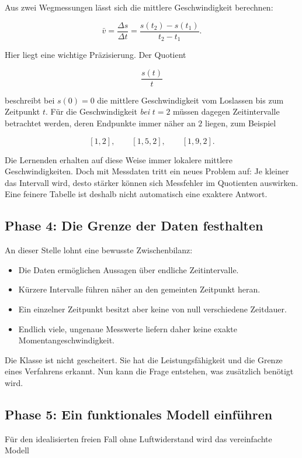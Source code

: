 \documentclass[11pt,a4paper]{article}
\begin{document}
Aus zwei Wegmessungen lässt sich die mittlere Geschwindigkeit berechnen:

\[
  \bar v=\frac{\Delta s}{\Delta t}
  =\frac{s(t_2)-s(t_1)}{t_2-t_1}.
\]

Hier liegt eine wichtige Präzisierung. Der Quotient

\[
  \frac{s(t)}{t}
\]

beschreibt bei $s(0)=0$ die mittlere Geschwindigkeit vom Loslassen bis zum
Zeitpunkt $t$. Für die Geschwindigkeit \emph{bei} $t=2$ müssen dagegen
Zeitintervalle betrachtet werden, deren Endpunkte immer näher an $2$ liegen,
zum Beispiel

\[
  [1,2],\qquad [1{,}5,2],\qquad [1{,}9,2].
\]

Die Lernenden erhalten auf diese Weise immer lokalere mittlere
Geschwindigkeiten. Doch mit Messdaten tritt ein neues Problem auf: Je kleiner
das Intervall wird, desto stärker können sich Messfehler im Quotienten
auswirken. Eine feinere Tabelle ist deshalb nicht automatisch eine exaktere
Antwort.

\subsection{Phase 4: Die Grenze der Daten festhalten}

An dieser Stelle lohnt eine bewusste Zwischenbilanz:

\begin{itemize}
  \item Die Daten ermöglichen Aussagen über endliche Zeitintervalle.
  \item Kürzere Intervalle führen näher an den gemeinten Zeitpunkt heran.
  \item Ein einzelner Zeitpunkt besitzt aber keine von null verschiedene
        Zeitdauer.
  \item Endlich viele, ungenaue Messwerte liefern daher keine exakte
        Momentangeschwindigkeit.
\end{itemize}

Die Klasse ist nicht gescheitert. Sie hat die Leistungsfähigkeit und die Grenze
eines Verfahrens erkannt. Nun kann die Frage entstehen, was zusätzlich benötigt
wird.

\subsection{Phase 5: Ein funktionales Modell einführen}

Für den idealisierten freien Fall ohne Luftwiderstand wird das vereinfachte
Modell
\end{document}
